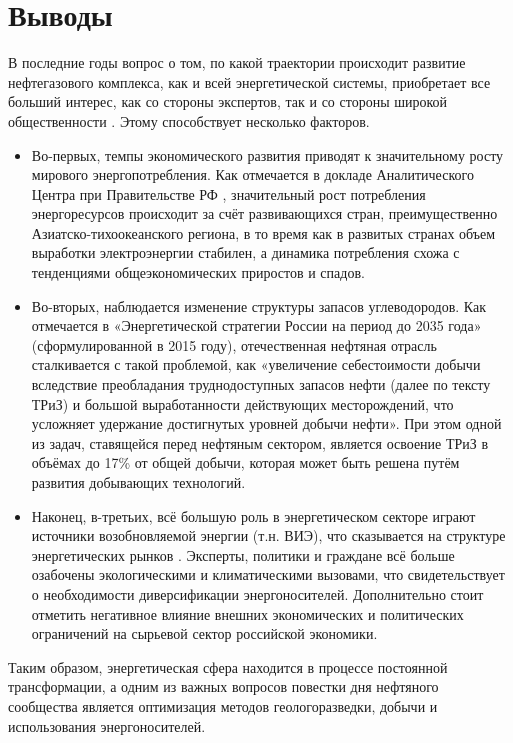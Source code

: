 \section{Выводы}
\label{conclusions}

В последние годы вопрос о том, по какой траектории происходит развитие нефтегазового комплекса, как и всей энергетической системы, приобретает все больший интерес, как со стороны экспертов, так и со стороны широкой общественности \cite{bakhtin2017trend,kuzminov2017global}. 
Этому способствует несколько факторов. 


\begin{itemize}
\tightlist
\item Во-первых, темпы экономического развития приводят к значительному росту мирового энергопотребления. Как отмечается в докладе Аналитического Центра при Правительстве РФ , значительный рост потребления энергоресурсов происходит за счёт развивающихся стран, преимущественно Азиатско-тихоокеанского региона, в то время как в развитых странах объем выработки электроэнергии стабилен, а динамика потребления схожа с тенденциями общеэкономических приростов и спадов. 

\item Во-вторых, наблюдается изменение структуры запасов углеводородов. Как отмечается в «Энергетической стратегии России на период до 2035 года»  (сформулированной в 2015 году), отечественная нефтяная отрасль сталкивается с такой проблемой, как «увеличение себестоимости добычи вследствие преобладания труднодоступных запасов нефти (далее по тексту ТРиЗ) и большой выработанности действующих месторождений, что усложняет удержание достигнутых уровней добычи нефти». При этом одной из задач, ставящейся перед нефтяным сектором, является освоение ТРиЗ в объёмах до 17\% от общей добычи, которая может быть решена путём развития добывающих технологий. 

\item Наконец, в-третьих, всё большую роль в энергетическом секторе играют источники возобновляемой энергии (т.н. ВИЭ), что сказывается на структуре энергетических рынков . Эксперты, политики и граждане всё больше озабочены экологическими и климатическими вызовами, что свидетельствует о необходимости диверсификации энергоносителей. Дополнительно стоит отметить негативное влияние внешних экономических и политических ограничений на сырьевой сектор российской экономики.
\end{itemize}

Таким образом, энергетическая сфера находится в процессе постоянной трансформации, а одним из важных вопросов повестки дня нефтяного сообщества является оптимизация методов геологоразведки, добычи и использования энергоносителей. 

